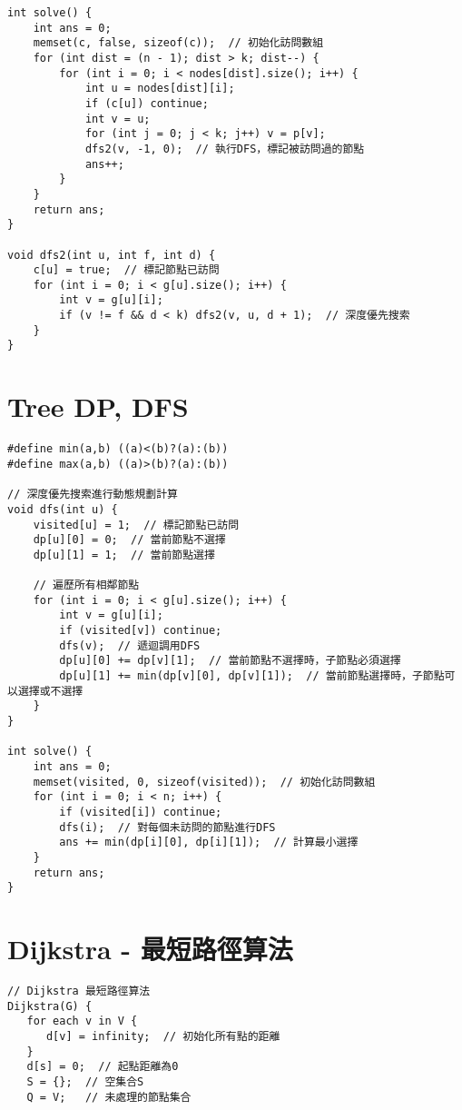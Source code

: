 \documentclass{article}
\begin{document}
\begin{multicols}{2}
\begin{lstlisting}
int solve() {
    int ans = 0;
    memset(c, false, sizeof(c));  // 初始化訪問數組
    for (int dist = (n - 1); dist > k; dist--) {
        for (int i = 0; i < nodes[dist].size(); i++) {
            int u = nodes[dist][i];
            if (c[u]) continue;
            int v = u;
            for (int j = 0; j < k; j++) v = p[v];
            dfs2(v, -1, 0);  // 執行DFS，標記被訪問過的節點
            ans++;
        }
    }
    return ans;
}

void dfs2(int u, int f, int d) {
    c[u] = true;  // 標記節點已訪問
    for (int i = 0; i < g[u].size(); i++) {
        int v = g[u][i];
        if (v != f && d < k) dfs2(v, u, d + 1);  // 深度優先搜索
    }
}
\end{lstlisting}

\section{Tree DP, DFS}

\begin{lstlisting}
#define min(a,b) ((a)<(b)?(a):(b))
#define max(a,b) ((a)>(b)?(a):(b))

// 深度優先搜索進行動態規劃計算
void dfs(int u) {
    visited[u] = 1;  // 標記節點已訪問
    dp[u][0] = 0;  // 當前節點不選擇
    dp[u][1] = 1;  // 當前節點選擇

    // 遍歷所有相鄰節點
    for (int i = 0; i < g[u].size(); i++) {
        int v = g[u][i];
        if (visited[v]) continue;
        dfs(v);  // 遞迴調用DFS
        dp[u][0] += dp[v][1];  // 當前節點不選擇時，子節點必須選擇
        dp[u][1] += min(dp[v][0], dp[v][1]);  // 當前節點選擇時，子節點可以選擇或不選擇
    }
}

int solve() {
    int ans = 0;
    memset(visited, 0, sizeof(visited));  // 初始化訪問數組
    for (int i = 0; i < n; i++) {
        if (visited[i]) continue;
        dfs(i);  // 對每個未訪問的節點進行DFS
        ans += min(dp[i][0], dp[i][1]);  // 計算最小選擇
    }
    return ans;
}
\end{lstlisting}

\section{Dijkstra - 最短路徑算法}

\begin{lstlisting}
// Dijkstra 最短路徑算法
Dijkstra(G) {
   for each v in V {
      d[v] = infinity;  // 初始化所有點的距離
   }
   d[s] = 0;  // 起點距離為0
   S = {};  // 空集合S
   Q = V;   // 未處理的節點集合


\end{lstlisting}
\end{multicols}
\end{document}
